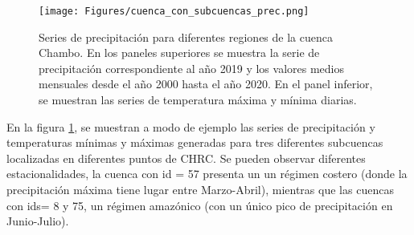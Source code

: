 \begin{figure}[h!]
  \begin{center}
    \texttt{[image: Figures/cuenca\_con\_subcuencas\_prec.png]}
    \caption{ Series de precipitación para diferentes regiones de la cuenca Chambo. En los paneles superiores  
    se muestra la serie de precipitación correspondiente al año 2019 y  los valores medios mensuales desde el año 2000 hasta 
    el año 2020. En el panel inferior, se muestran las series de temperatura máxima y mínima diarias.}
    \label{4}
  \end{center}
\end{figure}

En la figura \ref{4}, se muestran a modo de ejemplo las series de precipitación y temperaturas
mínimas y máximas generadas para tres diferentes subcuencas 
localizadas en diferentes puntos de CHRC. Se pueden observar diferentes estacionalidades,
la cuenca con id = 57 presenta un  un régimen costero (donde la precipitación máxima tiene lugar entre Marzo-Abril), 
mientras que las cuencas con ids= 8 y 75, un régimen amazónico (con un único pico de precipitación en Junio-Julio).


